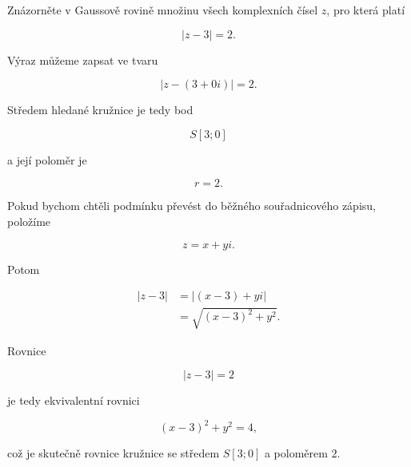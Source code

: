 \documentclass[12pt,a4paper]{article}
\begin{document}
\begin{examplebox}

    Znázorněte v Gaussově rovině množinu všech komplexních čísel $z$, pro která platí

    \[
        |z-3|=2.
    \]

    Výraz můžeme zapsat ve tvaru

    \[
        |z-(3+0i)|=2.
    \]

    Středem hledané kružnice je tedy bod

    \[
        S[3;0]
    \]

    a její poloměr je

    \[
        r=2.
    \]

    Pokud bychom chtěli podmínku převést do běžného souřadnicového zápisu, položíme

    \[
        z=x+yi.
    \]

    Potom

    \begin{align*}
        |z-3|
        &=
        |(x-3)+yi|\\
        &=
        \sqrt{(x-3)^2+y^2}.
    \end{align*}

    Rovnice

    \[
        |z-3|=2
    \]

    je tedy ekvivalentní rovnici

    \[
        (x-3)^2+y^2=4,
    \]

    což je skutečně rovnice kružnice se středem $S[3;0]$ a poloměrem $2$.

    \begin{center}
    \end{center}

\end{examplebox}
\end{document}
